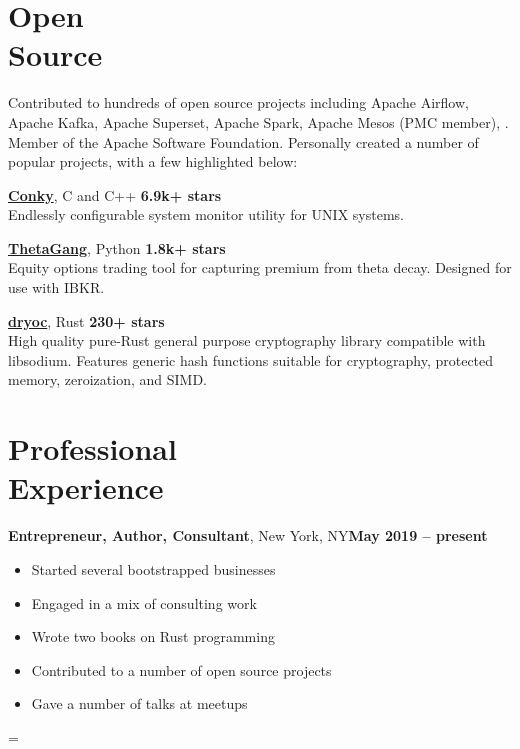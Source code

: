 \documentclass[margin,line]{resume}
\newenvironment{absolutelynopagebreak}
  {\par\nobreak\vfil\penalty0\vfilneg
   \vtop\bgroup}
  {\par\xdef\tpd{\the\prevdepth}\egroup
   \prevdepth=\tpd}
\begin{document}
\begin{resume}
    \section{\mysidestyle Open\\Source}

    Contributed to hundreds of open source projects including Apache Airflow,
    Apache Kafka, Apache Superset, Apache Spark, Apache Mesos (PMC member), . Member of the
    Apache Software Foundation. Personally created a number of popular projects,
    with a few highlighted below:

    \href{https://github.com/brndnmtthws/conky}{\textbf{Conky}}, C and C++ \hfill \textbf{6.9k+ stars}\\
    Endlessly configurable system monitor utility for UNIX systems.

    \href{https://github.com/brndnmtthws/thetagang}{\textbf{ThetaGang}}, Python \hfill \textbf{1.8k+ stars}\\
    Equity options trading tool for capturing premium from theta decay. Designed
    for use with IBKR.

    \href{https://github.com/brndnmtthws/dryoc}{\textbf{dryoc}}, Rust \hfill \textbf{230+ stars}\\
    High quality pure-Rust general purpose cryptography library compatible with
    libsodium.  Features generic hash functions suitable for cryptography,
    protected memory, zeroization, and SIMD.

    \vspace{3mm}

    \begin{absolutelynopagebreak}
    \section{\mysidestyle Professional\\Experience}

    \textbf{Entrepreneur, Author, Consultant}, New York, NY\hfill \textbf{May 2019 -- present}\vspace{2mm}\\\vspace{1mm}%
    \begin{itemize}
        \item Started several bootstrapped businesses
        \item Engaged in a mix of consulting work
        \item Wrote two books on Rust programming
        \item Contributed to a number of open source projects
        \item Gave a number of talks at meetups
    \end{itemize}
    \end{absolutelynopagebreak}


\end{resume}
\end{document}
